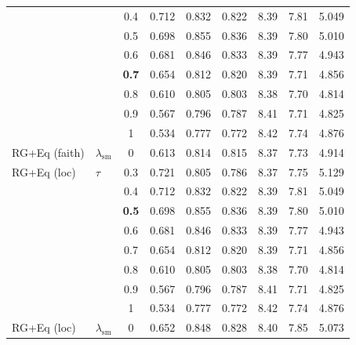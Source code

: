 \begin{longtable}{@{}l l c c c c c c c@{}}
 &  & 0.4 & 0.712 & 0.832 & 0.822 & 8.39 & 7.81 & 5.049 \\
 &  & 0.5 & 0.698 & 0.855 & 0.836 & 8.39 & 7.80 & 5.010 \\
 &  & 0.6 & 0.681 & 0.846 & 0.833 & 8.39 & 7.77 & 4.943 \\
 &  & \textbf{0.7} & 0.654 & 0.812 & 0.820 & 8.39 & 7.71 & 4.856 \\
 &  & 0.8 & 0.610 & 0.805 & 0.803 & 8.38 & 7.70 & 4.814 \\
 &  & 0.9 & 0.567 & 0.796 & 0.787 & 8.41 & 7.71 & 4.825 \\
 &  & 1 & 0.534 & 0.777 & 0.772 & 8.42 & 7.74 & 4.876 \\
\midrule
RG+Eq (faith) & $\lambda_{\mathrm{sm}}$ & 0 & 0.613 & 0.814 & 0.815 & 8.37 & 7.73 & 4.914 \\
\midrule
RG+Eq (loc) & $\tau$ & 0.3 & 0.721 & 0.805 & 0.786 & 8.37 & 7.75 & 5.129 \\
 &  & 0.4 & 0.712 & 0.832 & 0.822 & 8.39 & 7.81 & 5.049 \\
 &  & \textbf{0.5} & 0.698 & 0.855 & 0.836 & 8.39 & 7.80 & 5.010 \\
 &  & 0.6 & 0.681 & 0.846 & 0.833 & 8.39 & 7.77 & 4.943 \\
 &  & 0.7 & 0.654 & 0.812 & 0.820 & 8.39 & 7.71 & 4.856 \\
 &  & 0.8 & 0.610 & 0.805 & 0.803 & 8.38 & 7.70 & 4.814 \\
 &  & 0.9 & 0.567 & 0.796 & 0.787 & 8.41 & 7.71 & 4.825 \\
 &  & 1 & 0.534 & 0.777 & 0.772 & 8.42 & 7.74 & 4.876 \\
\midrule
RG+Eq (loc) & $\lambda_{\mathrm{sm}}$ & 0 & 0.652 & 0.848 & 0.828 & 8.40 & 7.85 & 5.073 \\
\end{longtable}
